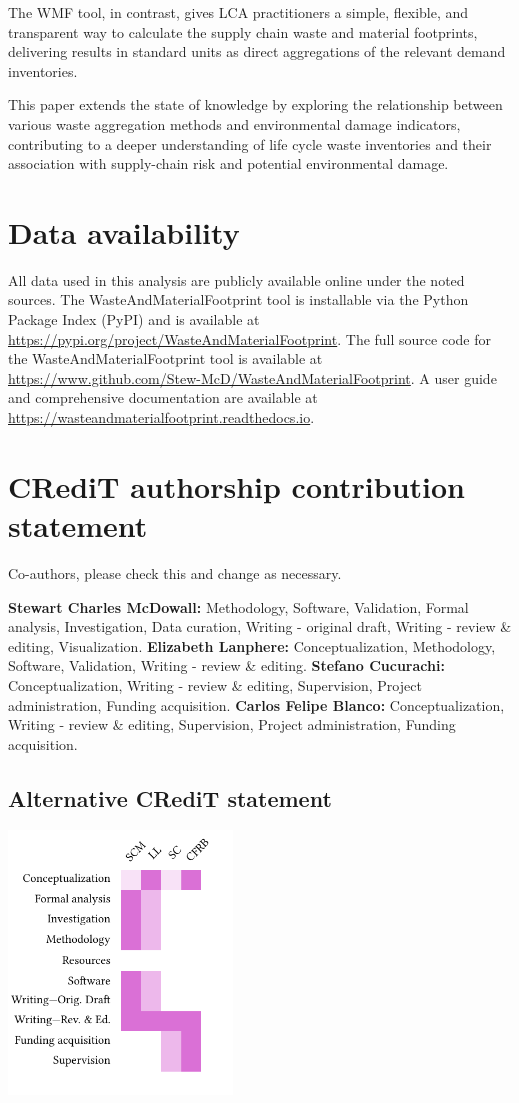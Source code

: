 \documentclass[review,3p,authoryear]{elsarticle}
\newcommand{\cbox}[1]{
    \begin{tcolorbox}[hbox, colback=red!5!white, colframe=red!65!black, boxrule=0.25pt, boxsep=2pt, left=2pt, right=2pt, top=1pt, bottom=1pt]
        \small\sffamily #1
    \end{tcolorbox}
}
\begin{document}
The WMF tool, in contrast, gives LCA practitioners a simple, flexible, and transparent way to calculate the supply chain waste and material footprints, delivering results in standard units as direct aggregations of the relevant demand inventories. 

This paper extends the state of knowledge by exploring the relationship between various waste aggregation methods and environmental damage indicators, contributing to a deeper understanding of life cycle waste inventories and their association with supply-chain risk and potential environmental damage.


\section*{Data availability} 
All data used in this analysis are publicly available online under the noted sources. The WasteAndMaterialFootprint tool is installable via the Python Package Index (PyPI) and is available at \url{https://pypi.org/project/WasteAndMaterialFootprint}.
The full source code for the WasteAndMaterialFootprint tool is available at \url{https://www.github.com/Stew-McD/WasteAndMaterialFootprint}.
A user guide and comprehensive documentation are available at \url{https://wasteandmaterialfootprint.readthedocs.io}.

\section*{CRediT authorship contribution statement}
\cbox{Co-authors, please check this and change as necessary.}
\textbf{Stewart Charles McDowall:} Methodology, Software, Validation, Formal analysis, Investigation, Data curation, Writing - original draft, Writing - review \& editing, Visualization.
\textbf{Elizabeth Lanphere:} Conceptualization, Methodology, Software, Validation, Writing - review \& editing.
\textbf{Stefano Cucurachi:} Conceptualization, Writing - review \& editing, Supervision, Project administration, Funding acquisition.
\textbf{Carlos Felipe Blanco:} Conceptualization, Writing - review \& editing, Supervision, Project administration, Funding acquisition.

\subsection*{Alternative CRediT statement}

\includegraphics[width=\columnwidth, height=7cm, keepaspectratio]{credit.pdf}
\end{document}
